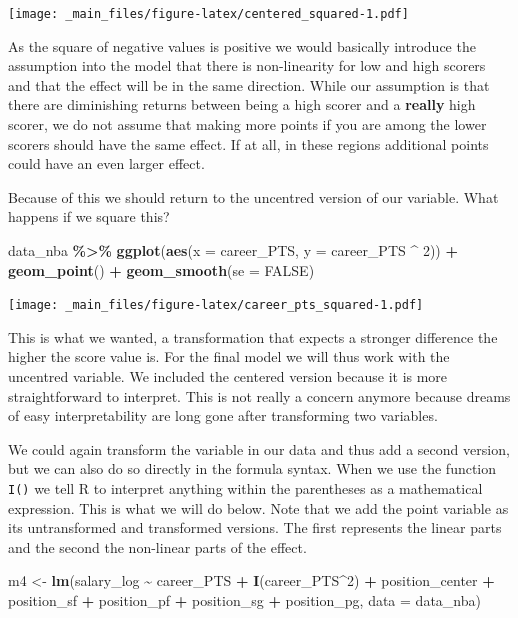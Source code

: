 \documentclass[
]{book}
\newenvironment{Shaded}{\begin{snugshade}}{\end{snugshade}}
\newcommand{\AttributeTok}[1]{\textcolor[rgb]{0.13,0.29,0.53}{#1}}
\newcommand{\ConstantTok}[1]{\textcolor[rgb]{0.56,0.35,0.01}{#1}}
\newcommand{\DecValTok}[1]{\textcolor[rgb]{0.00,0.00,0.81}{#1}}
\newcommand{\FunctionTok}[1]{\textcolor[rgb]{0.13,0.29,0.53}{\textbf{#1}}}
\newcommand{\NormalTok}[1]{#1}
\newcommand{\OtherTok}[1]{\textcolor[rgb]{0.56,0.35,0.01}{#1}}
\newcommand{\SpecialCharTok}[1]{\textcolor[rgb]{0.81,0.36,0.00}{\textbf{#1}}}
\begin{document}
\texttt{[image: \_main\_files/figure-latex/centered\_squared-1.pdf]}

As the square of negative values is positive we would basically introduce the
assumption into the model that there is non-linearity for low and high scorers
and that the effect will be in the same direction. While our assumption is that
there are diminishing returns between being a high scorer and a \textbf{really} high
scorer, we do not assume that making more points if you are among the lower
scorers should have the same effect. If at all, in these regions additional
points could have an even larger effect.

Because of this we should return to the uncentred version of our variable. What
happens if we square this?

\begin{Shaded}
\begin{Highlighting}[]
\NormalTok{data\_nba }\SpecialCharTok{\%\textgreater{}\%} 
  \FunctionTok{ggplot}\NormalTok{(}\FunctionTok{aes}\NormalTok{(}\AttributeTok{x =}\NormalTok{ career\_PTS, }\AttributeTok{y =}\NormalTok{ career\_PTS }\SpecialCharTok{\^{}} \DecValTok{2}\NormalTok{)) }\SpecialCharTok{+}
  \FunctionTok{geom\_point}\NormalTok{() }\SpecialCharTok{+}
  \FunctionTok{geom\_smooth}\NormalTok{(}\AttributeTok{se =} \ConstantTok{FALSE}\NormalTok{)}
\end{Highlighting}
\end{Shaded}

\texttt{[image: \_main\_files/figure-latex/career\_pts\_squared-1.pdf]}

This is what we wanted, a transformation that expects a stronger difference the
higher the score value is. For the final model we will thus work with the
uncentred variable. We included the centered version because it is more
straightforward to interpret. This is not really a concern anymore because
dreams of easy interpretability are long gone after transforming two variables.

We could again transform the variable in our data and thus add a second version,
but we can also do so directly in the formula syntax. When we use the function
\texttt{I()} we tell R to interpret anything within the parentheses as a mathematical
expression. This is what we will do below. Note that we add the point variable
as its untransformed and transformed versions. The first represents the linear
parts and the second the non-linear parts of the effect.

\begin{Shaded}
\begin{Highlighting}[]
\NormalTok{m4 }\OtherTok{\textless{}{-}} \FunctionTok{lm}\NormalTok{(salary\_log }\SpecialCharTok{\textasciitilde{}}\NormalTok{ career\_PTS }\SpecialCharTok{+} \FunctionTok{I}\NormalTok{(career\_PTS}\SpecialCharTok{\^{}}\DecValTok{2}\NormalTok{) }\SpecialCharTok{+}\NormalTok{ position\_center }\SpecialCharTok{+}\NormalTok{ position\_sf }\SpecialCharTok{+}\NormalTok{ position\_pf }\SpecialCharTok{+}\NormalTok{ position\_sg }\SpecialCharTok{+}\NormalTok{ position\_pg, }\AttributeTok{data =}\NormalTok{ data\_nba)}
\end{Highlighting}
\end{Shaded}
\end{document}
